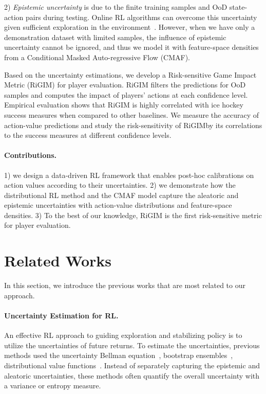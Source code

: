 \documentclass{article}
\newcommand{\sys}{RiGIM}
\newcommand{\system}{\sys\;}
\begin{document}
2) {\it Epistemic uncertainty} is due to the finite training samples and OoD state-action pairs during testing. Online RL algorithms can overcome this uncertainty given sufficient exploration in the environment~\cite{Mavrin2019DistributionalRL}. However, when we have only a demonstration dataset with limited samples, the influence of epistemic uncertainty cannot be ignored, and thus we model it with feature-space densities from a Conditional Masked Auto-regressive Flow (CMAF).

Based on the uncertainty estimations, we develop a Risk-sensitive Game Impact Metric (RiGIM) for player evaluation. RiGIM filters the predictions for OoD samples and computes the impact of players' actions at each confidence level.
Empirical evaluation shows that RiGIM is highly correlated with ice hockey success measures when compared to other baselines. 
We measure the accuracy of action-value predictions and study the risk-sensitivity of \system by its correlations to the success measures at different confidence levels.

\paragraph{Contributions.} 1) we design a data-driven RL framework that enables post-hoc calibrations on action values according to their uncertainties. 2) we demonstrate how the distributional RL method and the CMAF model capture the aleatoric and epistemic uncertainties with action-value distributions and feature-space densities. 3) To the best of our knowledge, RiGIM is the first risk-sensitive metric for player evaluation.

\vspace{-0.05in}
\section{Related Works}
In this section, we introduce the previous works that are most related to our approach.
\paragraph{Uncertainty Estimation for RL.} 
An effective RL approach to guiding exploration and stabilizing policy is to utilize the uncertainties of future returns. To estimate the uncertainties, previous methods used the uncertainty Bellman equation~\cite{ODonoghue2018UncertaintyBellman}, bootstrap ensembles~\cite{Chen2017QEnsembles,Kumar2019Stable,Yu2020MOPO}, distributional value functions~\cite{Tang2018DistribExplore,Zhang2019QUOTA,Mavrin2019DistributionalRL}. Instead of separately capturing the epistemic and aleatoric uncertainties, these methods often quantify the overall uncertainty with a variance or entropy measure. 
\end{document}
